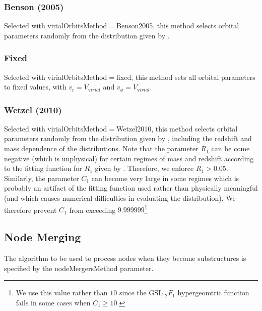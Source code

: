 \subsubsection{Benson (2005)}\label{sec:VirialOrbitsBenson2005}

Selected with {\normalfont \ttfamily virialOrbitsMethod}$=${\normalfont \ttfamily Benson2005}, this method selects orbital parameters randomly from the distribution given by \cite{benson_orbital_2005}.

\subsubsection{Fixed}

Selected with {\normalfont \ttfamily virialOrbitsMethod}$=${\normalfont \ttfamily fixed}, this method sets all orbital parameters to fixed values, with $v_{\mathrm r}=${\normalfont \ttfamily [virialOrbitsFixedRadialVelocity]}$V_{\mathrm virial}$ and  $v_\phi=${\normalfont \ttfamily [virialOrbitsFixedTangentialVelocity]}$V_{\mathrm virial}$.

\subsubsection{Wetzel (2010)}

Selected with {\normalfont \ttfamily virialOrbitsMethod}$=${\normalfont \ttfamily Wetzel2010}, this method selects orbital parameters randomly from the distribution given by \cite{wetzel_orbits_2010}, including the redshift and mass dependence of the distributions. Note that the parameter $R_1$ can be come negative (which is unphysical) for certain regimes of mass and redshift according to the fitting function for $R_1$ given by \cite{wetzel_orbits_2010}. Therefore, we enforce $R_1>0.05$. Similarly, the parameter $C_1$ can become very large in some regimes which is probably an artifact of the fitting function used rather than physically meaningful (and which causes numerical difficulties in evaluating the distribution). We therefore prevent $C_1$ from exceeding $9.999999$\footnote{We use this value rather than $10$ since the GSL $_2F_1$ hypergeomtric function fails in some cases when $C_1\ge 10$.}

\subsection{Node Merging}

The algorithm to be used to process nodes when they become substructures is specified by the {\normalfont \ttfamily nodeMergersMethod} parameter.


